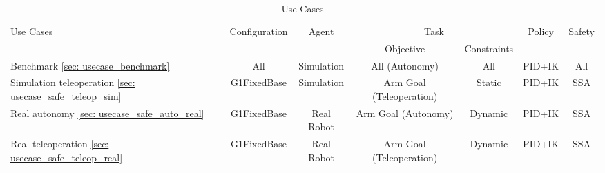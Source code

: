 \begin{table}[ht]
\caption{Use Cases}
\centering
\begin{tabular}{lcccccc}
    \toprule
    \multirow{2}{*}{\centering Use Cases} & \multirow{2}{*}{\centering Configuration} & \multirow{2}{*}{\centering Agent} & \multicolumn{2}{c}{Task} & \multirow{2}{*}{\centering Policy} & \multirow{2}{*}{\centering Safety} \\
    \cmidrule(lr){4-5}
    & & & Objective & Constraints & & \\
    \midrule
    Benchmark \ref{sec: usecase_benchmark} & All & Simulation & All (Autonomy) & All & PID+IK & All \\
    Simulation teleoperation \ref{sec: usecase_safe_teleop_sim} & G1FixedBase & Simulation & Arm Goal (Teleoperation) & Static & PID+IK & SSA \\
    Real autonomy \ref{sec: usecase_safe_auto_real} & G1FixedBase & Real Robot & Arm Goal (Autonomy) & Dynamic & PID+IK & SSA \\
    Real teleoperation \ref{sec: usecase_safe_teleop_real} & G1FixedBase & Real Robot & Arm Goal (Teleoperation) & Dynamic & PID+IK & SSA \\
    \bottomrule
\end{tabular}
\label{tab:config_agent_task_obstacle_control_safety}
\end{table}
